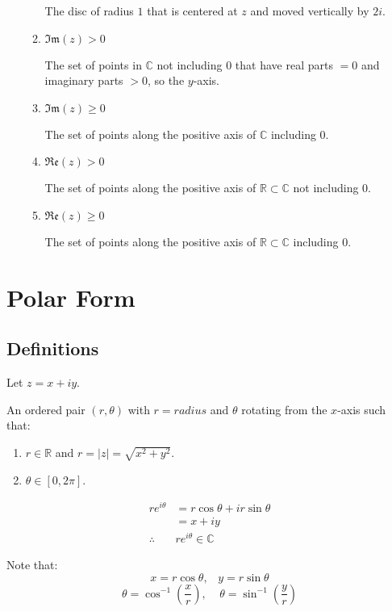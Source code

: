 \begin{enumerate}
\begin{enumerate}
		The disc of radius $1$ that is centered at $z$ and moved vertically by $2i.$
		\item $\mathfrak{Im}(z) > 0$ 
	
		The set of points in $\mathbb{C}$ not including $0$ that have real parts $= 0$ and imaginary parts $>0$, so the $y$-axis.
		\item $\mathfrak{Im}(z) \geq 0$

		The set of points along the positive axis of $\mathbb{C}$ including $0.$
		\item $\mathfrak{Re}(z) > 0$

		The set of points along the positive axis of $\mathbb{R} \subset \mathbb{C}$ not including $0.$
		\item $\mathfrak{Re}(z) \geq 0$

		The set of points along the positive axis of $\mathbb{R} \subset \mathbb{C}$ including $0.$
	\end{enumerate}
\end{enumerate}


\section{Polar Form}
\subsection{Definitions}

Let $z = x +iy.$

\begin{defn}
	An ordered pair $(r, \theta)$ with $r = radius$ and $\theta$ rotating from the $x$-axis such that:
	\begin{enumerate}
		\item $r \in \mathbb{R}$ and $r = |z| = \sqrt{x^2 + y^2}.$
		\item $\theta  \in [0, 2\pi].$
	\end{enumerate}
\end{defn}
\begin{defn}
	\begin{align*}
		re^{i\theta} &= r\cos{\theta} + ir\sin{\theta} \\
		&= x + iy \\
		\therefore \;\; &re^{i\theta} \in \mathbb{C}
	\end{align*}
\end{defn}
Note that:
\[x = r\cos{\theta}, \;\;\; y = r\sin{\theta}\]
\[\theta = \cos^{-1}{ \left( \frac{x}{r} \right)  }, \;\;\;\; \theta = \sin^{-1} \left( { \frac{y}{r} } \right) \]
